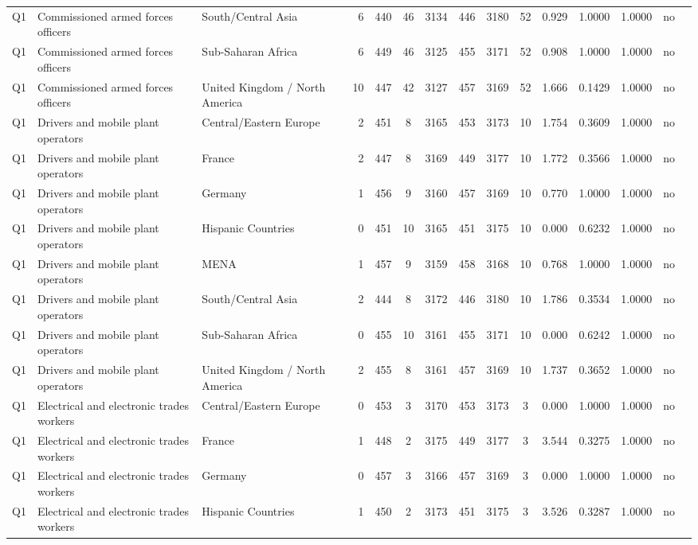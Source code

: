 \begin{longtable}{lllrcccccccccll}
Q1 & Commissioned armed forces officers & South/Central Asia & 6 & 440 & 46 & 3134 & 446 & 3180 & 52 & 0.929 & 1.0000 & 1.0000 & no \\
Q1 & Commissioned armed forces officers & Sub-Saharan Africa & 6 & 449 & 46 & 3125 & 455 & 3171 & 52 & 0.908 & 1.0000 & 1.0000 & no \\
Q1 & Commissioned armed forces officers & United Kingdom / North America & 10 & 447 & 42 & 3127 & 457 & 3169 & 52 & 1.666 & 0.1429 & 1.0000 & no \\
Q1 & Drivers and mobile plant operators & Central/Eastern Europe & 2 & 451 & 8 & 3165 & 453 & 3173 & 10 & 1.754 & 0.3609 & 1.0000 & no \\
Q1 & Drivers and mobile plant operators & France & 2 & 447 & 8 & 3169 & 449 & 3177 & 10 & 1.772 & 0.3566 & 1.0000 & no \\
Q1 & Drivers and mobile plant operators & Germany & 1 & 456 & 9 & 3160 & 457 & 3169 & 10 & 0.770 & 1.0000 & 1.0000 & no \\
Q1 & Drivers and mobile plant operators & Hispanic Countries & 0 & 451 & 10 & 3165 & 451 & 3175 & 10 & 0.000 & 0.6232 & 1.0000 & no \\
Q1 & Drivers and mobile plant operators & MENA & 1 & 457 & 9 & 3159 & 458 & 3168 & 10 & 0.768 & 1.0000 & 1.0000 & no \\
Q1 & Drivers and mobile plant operators & South/Central Asia & 2 & 444 & 8 & 3172 & 446 & 3180 & 10 & 1.786 & 0.3534 & 1.0000 & no \\
Q1 & Drivers and mobile plant operators & Sub-Saharan Africa & 0 & 455 & 10 & 3161 & 455 & 3171 & 10 & 0.000 & 0.6242 & 1.0000 & no \\
Q1 & Drivers and mobile plant operators & United Kingdom / North America & 2 & 455 & 8 & 3161 & 457 & 3169 & 10 & 1.737 & 0.3652 & 1.0000 & no \\
Q1 & Electrical and electronic trades workers & Central/Eastern Europe & 0 & 453 & 3 & 3170 & 453 & 3173 & 3 & 0.000 & 1.0000 & 1.0000 & no \\
Q1 & Electrical and electronic trades workers & France & 1 & 448 & 2 & 3175 & 449 & 3177 & 3 & 3.544 & 0.3275 & 1.0000 & no \\
Q1 & Electrical and electronic trades workers & Germany & 0 & 457 & 3 & 3166 & 457 & 3169 & 3 & 0.000 & 1.0000 & 1.0000 & no \\
Q1 & Electrical and electronic trades workers & Hispanic Countries & 1 & 450 & 2 & 3173 & 451 & 3175 & 3 & 3.526 & 0.3287 & 1.0000 & no \\

\end{longtable}
